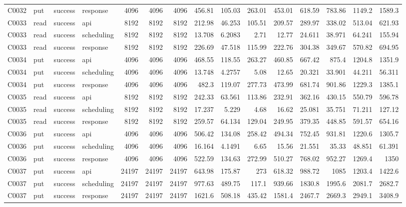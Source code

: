 \begin{landscape}
\begin{longtable}{llllrrrrrrrrrrr}
C0032 & put & success & response & 4096 & 4096 & 4096 & 456.81 & 105.03 & 263.01 & 453.01 & 618.59 & 783.86 & 1149.2 & 1589.3\\
C0033 & read & success & api & 8192 & 8192 & 8192 & 212.98 & 46.253 & 105.51 & 209.57 & 289.97 & 338.02 & 513.04 & 621.93\\
C0033 & read & success & scheduling & 8192 & 8192 & 8192 & 13.708 & 6.2083 & 2.71 & 12.77 & 24.611 & 38.971 & 64.241 & 155.94\\
C0033 & read & success & response & 8192 & 8192 & 8192 & 226.69 & 47.518 & 115.99 & 222.76 & 304.38 & 349.67 & 570.82 & 694.95\\
C0034 & put & success & api & 4096 & 4096 & 4096 & 468.55 & 118.55 & 263.27 & 460.85 & 667.42 & 875.4 & 1204.8 & 1351.9\\
C0034 & put & success & scheduling & 4096 & 4096 & 4096 & 13.748 & 4.2757 & 5.08 & 12.65 & 20.321 & 33.901 & 44.211 & 56.311\\
C0034 & put & success & response & 4096 & 4096 & 4096 & 482.3 & 119.07 & 277.73 & 473.99 & 681.74 & 901.86 & 1229.3 & 1385.1\\
C0035 & read & success & api & 8192 & 8192 & 8192 & 242.33 & 63.561 & 113.86 & 232.91 & 362.16 & 430.15 & 550.79 & 596.78\\
C0035 & read & success & scheduling & 8192 & 8192 & 8192 & 17.237 & 5.229 & 4.68 & 16.62 & 25.081 & 35.751 & 71.211 & 127.12\\
C0035 & read & success & response & 8192 & 8192 & 8192 & 259.57 & 64.134 & 129.04 & 249.95 & 379.35 & 448.85 & 591.57 & 654.16\\
C0036 & put & success & api & 4096 & 4096 & 4096 & 506.42 & 134.08 & 258.42 & 494.34 & 752.45 & 931.81 & 1220.6 & 1305.7\\
C0036 & put & success & scheduling & 4096 & 4096 & 4096 & 16.164 & 4.1491 & 6.65 & 15.56 & 21.551 & 35.33 & 48.851 & 61.391\\
C0036 & put & success & response & 4096 & 4096 & 4096 & 522.59 & 134.63 & 272.99 & 510.27 & 768.02 & 952.27 & 1269.4 & 1350\\
C0037 & put & success & api & 24197 & 24197 & 24197 & 643.98 & 175.87 & 273 & 618.32 & 988.72 & 1085 & 1203.4 & 1422.6\\
C0037 & put & success & scheduling & 24197 & 24197 & 24197 & 977.63 & 489.75 & 117.1 & 939.66 & 1830.8 & 1995.6 & 2081.7 & 2682.7\\
C0037 & put & success & response & 24197 & 24197 & 24197 & 1621.6 & 508.18 & 435.42 & 1581.4 & 2467.7 & 2669.3 & 2949.1 & 3408.9\\

\end{longtable}
\end{landscape}
